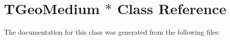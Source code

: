 \hypertarget{class_t_geo_medium_01_5}{
\section{TGeoMedium $\ast$ Class Reference}
\label{class_t_geo_medium_01_5}
}


The documentation for this class was generated from the following files: